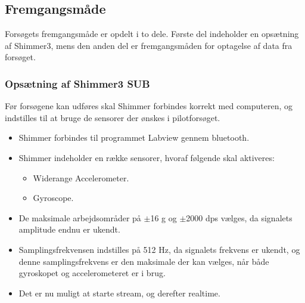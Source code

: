 \subsection{Fremgangsmåde}
Forsøgets fremgangsmåde er opdelt i to dele. Første del indeholder en opsætning af Shimmer3, mens den anden del er fremgangsmåden for optagelse af data fra forsøget.

\subsubsection{Opsætning af Shimmer3 SUB}
Før forsøgene kan udføres skal Shimmer forbindes korrekt med computeren, og indstilles til at bruge de sensorer der ønskes i pilotforsøget. \vspace{-3mm}
\begin{itemize}
	\item Shimmer forbindes til programmet Labview gennem bluetooth.
	\item Shimmer indeholder en række sensorer, hvoraf følgende skal aktiveres: 
	\begin{itemize}
		\item Widerange Accelerometer.
		\item Gyroscope.
	\end{itemize}
	\item De maksimale arbejdsområder på $\pm$16 g og $\pm$2000 dps vælges, da signalets amplitude endnu er ukendt.
	\item Samplingsfrekvensen indstilles på 512 Hz, da signalets frekvens er ukendt, og denne samplingsfrekvens er den maksimale der kan vælges, når både gyroskopet og accelerometeret er i brug.  
	\item Det er nu muligt at starte stream, og derefter realtime.
	
	
\end{itemize}




